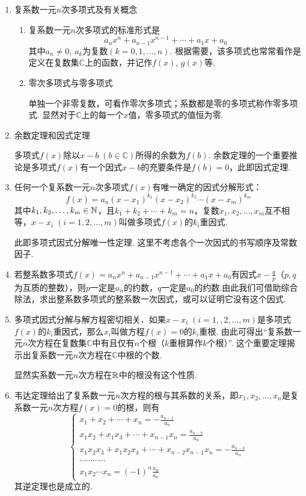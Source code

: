\begin{enumerate}
    \item 复系数一元$n$次多项式及有关概念
\begin{enumerate}[(1)]
    \item 复系数一元$n$次多项式的标准形式是
    $$a_nx^n+a_{n-1}x^{n-1}+\cdots+a_1x+a_0$$ 其中$a_n\ne 0$, $a_k$为复数$(k=0,1,\ldots ,n)$. 根据需要，该多项式也常常看作是定义在复数集$\mathbb{C}$上的函数，并记作$f(x)$, $g(x)$等.
    \item 零次多项式与零多项式
    
单独一个非零复数，可看作零次多项式；系数都是零的多项式称作零多项式. 显然对于$\mathbb{C}$上的每一个$x$值，零多项式的值恒为零.
\end{enumerate}

\item 余数定理和因式定理

多项式$f(x)$除以$x-b\; (b\in\mathbb{C})$所得的余数为$f(b)$. 余数定理的一个重要推论是多项式$f(x)$有一个因式$x-b$的充要条件是$f(b)=0$，此即因式定理.

\item 任何一个复系数一元$n$次多项式$f(x)$有唯一确定的因式分解形式：
\[f(x)=a_n(x-x_1)^{k_1}(x-x_2)^{k_2}\cdots (x-x_m)^{k_m}\]
其中$k_1,k_2,\ldots,k_m\in\mathbb{N}$，且$k_1+k_2+\cdots+k_m=n$，复数$x_1,x_2,\ldots,x_m$互不相等，$x-x_i\; (i=1,2,\ldots,m)$叫做多项式$f(x)$的$k_i$重因式.

此即多项式因式分解唯一性定理. 这里不考虑各个一次因式的书写顺序及常数因子.

\item 若整系数多项式$f(x)=a_nx^n+a_{n-1}x^{n-1}+\cdots+a_1x+a_0$有因式$x-\frac{q}{p}$（$p,q$为互质的整数），则$p$一定是$a_n$的约数，$q$一定是$a_0$的约数.由此我们可借助综合除法，求出整系数多项式的整系数一次因式，或可以证明它没有这个因式.
\item 多项式因式分解与解方程密切相关．如果$x-x_i\; (i=1,,2,\ldots,m)$是多项式$f(x)$的$k_i$重因式，那么$x_i$叫做方程$f(x)=0$的$k_i$重根. 由此可得出“复系数一元$n$次方程在复数集$\mathbb{C}$中有且仅有$n$个根（$k$重根算作$k$个根）”. 这个重要定理揭示出复系数一元$n$次方程在$\mathbb{C}$中根的个数.

显然实系数一元$n$次方程在$\mathbb{R}$中的根没有这个性质.
\item 韦达定理给出了复系数一元$n$次方程的根与其系数的关系，即$x_1,x_2,\ldots,x_n$是复系数一元$n$次方程$f(x)=0$的根，则有
\[\begin{cases}
x_1+x_2+\cdots+x_n=-\frac{a_{n-1}}{a_n}\\
x_1x_2+x_1x_3+\cdots+x_{n-1}x_n=\frac{a_{n-2}}{a_n}\\
x_1x_2x_3+x_1x_2x_4+\cdots+x_{n-2}x_{n-1}x_n=-\frac{a_{n-3}}{a_n}\\
\cdots\cdots\cdots\cdots\\
x_1x_2\cdots x_n=(-1)^n \frac{a_0}{a_n}
\end{cases} \]
其逆定理也是成立的.


\end{enumerate}
